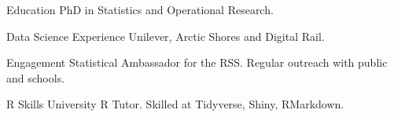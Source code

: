 

\begin{cvskills}
  \cvskill
    {Education} %
    {PhD in Statistics and Operational Research.} %

  \cvskill
    {Data Science Experience} %
    {Unilever, Arctic Shores and Digital Rail.} %

  \cvskill
    {Engagement} %
    {Statistical Ambassador for the RSS. Regular outreach with public and schools.} %

  \cvskill
    {R Skills} %
    {University R Tutor. Skilled at Tidyverse, Shiny, RMarkdown.} %


\end{cvskills}
